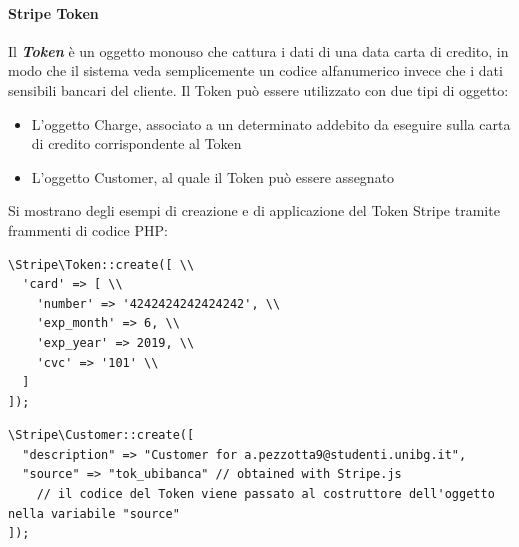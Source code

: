 \paragraph{Stripe Token}
Il \textit{\textbf{Token}} è un oggetto monouso che cattura i dati di una data carta di credito, in modo che il sistema veda semplicemente un codice alfanumerico invece che i dati sensibili bancari del cliente. Il Token può essere utilizzato con due tipi di oggetto: 
\begin{itemize}
\item L'oggetto Charge, associato a un determinato addebito da eseguire sulla carta di credito corrispondente al Token
\item L'oggetto Customer, al quale il Token può essere assegnato
\end{itemize}
Si mostrano degli esempi di creazione e di applicazione del Token Stripe tramite frammenti di codice PHP: 
\begin{lstlisting}[caption={Creazione di un Token associato alla carta di credito indicata nell'array card}]
\Stripe\Token::create([ \\
  'card' => [ \\
    'number' => '4242424242424242', \\
    'exp_month' => 6, \\
    'exp_year' => 2019, \\
    'cvc' => '101' \\
  ]
]);
\end{lstlisting}
\begin{lstlisting}[caption={creazione di un oggetto Customer, che verrà poi utilizzato per gestire pagamenti e vendite sul portale Equiticket}]
\Stripe\Customer::create([
  "description" => "Customer for a.pezzotta9@studenti.unibg.it",
  "source" => "tok_ubibanca" // obtained with Stripe.js
	// il codice del Token viene passato al costruttore dell'oggetto nella variabile "source"
]);
\end{lstlisting}

